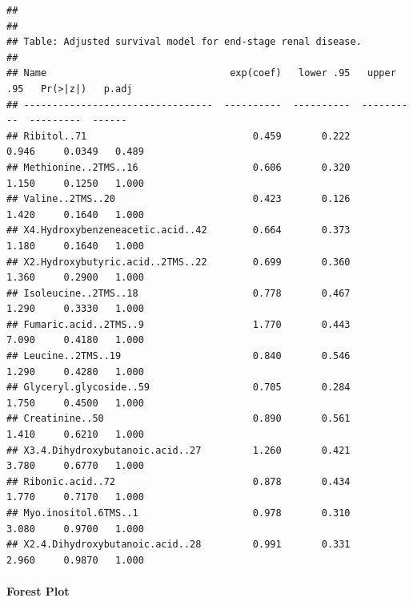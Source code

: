 \documentclass[]{article}
\let\oldparagraph\paragraph
\renewcommand{\paragraph}[1]{\oldparagraph{#1}\mbox{}}
\begin{document}
\begin{verbatim}
## 
## 
## Table: Adjusted survival model for end-stage renal disease.
## 
## Name                                exp(coef)   lower .95   upper .95   Pr(>|z|)   p.adj
## ---------------------------------  ----------  ----------  ----------  ---------  ------
## Ribitol..71                             0.459       0.222       0.946     0.0349   0.489
## Methionine..2TMS..16                    0.606       0.320       1.150     0.1250   1.000
## Valine..2TMS..20                        0.423       0.126       1.420     0.1640   1.000
## X4.Hydroxybenzeneacetic.acid..42        0.664       0.373       1.180     0.1640   1.000
## X2.Hydroxybutyric.acid..2TMS..22        0.699       0.360       1.360     0.2900   1.000
## Isoleucine..2TMS..18                    0.778       0.467       1.290     0.3330   1.000
## Fumaric.acid..2TMS..9                   1.770       0.443       7.090     0.4180   1.000
## Leucine..2TMS..19                       0.840       0.546       1.290     0.4280   1.000
## Glyceryl.glycoside..59                  0.705       0.284       1.750     0.4500   1.000
## Creatinine..50                          0.890       0.561       1.410     0.6210   1.000
## X3.4.Dihydroxybutanoic.acid..27         1.260       0.421       3.780     0.6770   1.000
## Ribonic.acid..72                        0.878       0.434       1.770     0.7170   1.000
## Myo.inositol.6TMS..1                    0.978       0.310       3.080     0.9700   1.000
## X2.4.Dihydroxybutanoic.acid..28         0.991       0.331       2.960     0.9870   1.000
\end{verbatim}

\newpage

\hypertarget{forest-plot-7}{%
\paragraph{Forest Plot}\label{forest-plot-7}}
\end{document}
